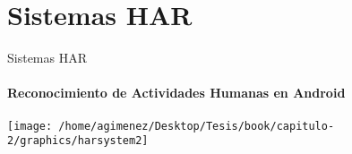 
\section{Sistemas HAR}
\begin{frame}{Sistemas HAR}

\framesubtitle{Reconocimiento de Actividades Humanas en Android}
\begin{center}
\texttt{[image: /home/agimenez/Desktop/Tesis/book/capitulo-2/graphics/harsystem2]}
\par\end{center}
\end{frame}

